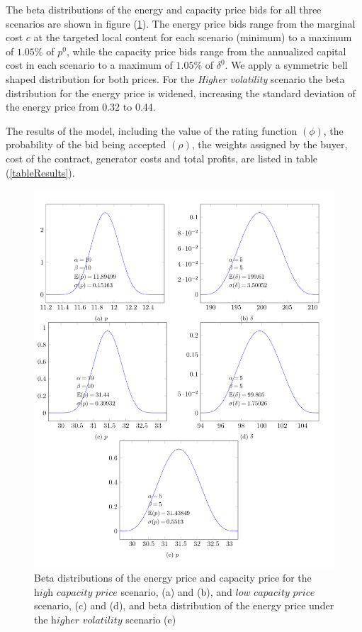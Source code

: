 \documentclass[informs]{informs3}
\begin{document}
The beta distributions of the energy and capacity price bids for all three scenarios are shown in figure (\ref{figBetaPrices}). The energy price bids range from the marginal cost $c$ at the targeted local content for each scenario (minimum) to a maximum of $1.05\%$ of $p^0$, while the capacity price bids range from the annualized capital cost in each scenario to a maximum of $1.05\%$ of $\delta^0$. We apply a symmetric bell shaped distribution for both prices. For the \textit{Higher volatility} scenario the beta distribution for the energy price is widened, increasing the standard deviation of the energy price from 0.32 to 0.44.

The results of the model, including the value of the rating function $(\phi)$, the probability of the bid being accepted $(\rho)$, the weights assigned by the buyer, cost of the contract, generator costs and total profits, are listed in table (\ref{tableResults}).
\begin{figure}
	\centering 
	\includegraphics[scale=1]{figure2.png}
    \caption{Beta distributions of the energy price and capacity price for the $\textit{high capacity price}$ scenario, (a) and (b), and $\textit{low capacity price}$ scenario, (c) and (d), and beta distribution of the energy price under the $\textit{higher volatility} $ scenario (e)}
    \label{figBetaPrices}
\end{figure}
\end{document}
